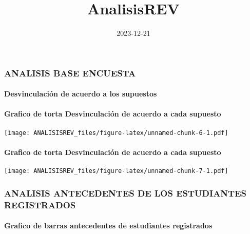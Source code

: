 \documentclass[
]{article}
\title{AnalisisREV}
\author{}
\date{\vspace{-2.5em}2023-12-21}
\begin{document}
\maketitle

{
\setcounter{tocdepth}{2}
\tableofcontents
}
\hypertarget{analisis-base-encuesta}{%
\subsubsection{ANALISIS BASE ENCUESTA}\label{analisis-base-encuesta}}

\hypertarget{desvinculaciuxf3n-de-acuerdo-a-los-supuestos}{%
\paragraph{Desvinculación de acuerdo a los
supuestos}\label{desvinculaciuxf3n-de-acuerdo-a-los-supuestos}}

\hypertarget{grafico-de-torta-desvinculaciuxf3n-de-acuerdo-a-cada-supuesto}{%
\paragraph{Grafico de torta Desvinculación de acuerdo a cada
supuesto}\label{grafico-de-torta-desvinculaciuxf3n-de-acuerdo-a-cada-supuesto}}

\texttt{[image: ANALISISREV\_files/figure-latex/unnamed-chunk-6-1.pdf]}

\hypertarget{grafico-de-torta-desvinculaciuxf3n-de-acuerdo-a-cada-supuesto-1}{%
\paragraph{Grafico de torta Desvinculación de acuerdo a cada
supuesto}\label{grafico-de-torta-desvinculaciuxf3n-de-acuerdo-a-cada-supuesto-1}}

\texttt{[image: ANALISISREV\_files/figure-latex/unnamed-chunk-7-1.pdf]}

\hypertarget{analisis-antecedentes-de-los-estudiantes-registrados}{%
\subsubsection{ANALISIS ANTECEDENTES DE LOS ESTUDIANTES
REGISTRADOS}\label{analisis-antecedentes-de-los-estudiantes-registrados}}

\hypertarget{grafico-de-barras-antecedentes-de-estudiantes-registrados}{%
\paragraph{Grafico de barras antecedentes de estudiantes
registrados}\label{grafico-de-barras-antecedentes-de-estudiantes-registrados}}
\end{document}
